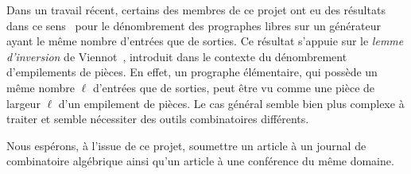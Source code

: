 \documentclass[10pt,reqno]{amsart}
\numberwithin{equation}{subsection}
\newcommand{\Gen}{\mathcal{G}}
\begin{document}
Dans un travail récent, certains des membres de ce projet ont eu des
résultats dans ce sens~\cite{BG14} pour le dénombrement des prographes
libres sur un générateur ayant le même nombre d'entrées que de sorties.
Ce résultat s'appuie sur le {\em lemme d'inversion} de Viennot~\cite{Vie86},
introduit dans le contexte du dénombrement d'empilements de pièces. En
effet, un prographe élémentaire, qui possède un même nombre $\ell$
d'entrées que de sorties, peut être vu comme une pièce de largeur $\ell$
d'un empilement de pièces. Le cas général semble bien plus complexe à
traiter et semble nécessiter des outils combinatoires différents.

Nous espérons, à l'issue de ce projet, soumettre un article à un journal
de combinatoire algébrique ainsi qu'un article à une conférence du
même domaine.



\end{document}
